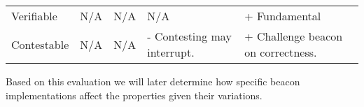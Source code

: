 \begin{table}[]
\begin{tabular}{@{}lllll@{}}
    Verifiable             & N/A                                                                       & N/A                                    & N/A                                                    & + Fundamental                                                    \\
    Contestable            & N/A                                                                       & N/A                                    & - Contesting may interrupt.                            & + Challenge beacon on correctness.                               \\ \bottomrule
    \end{tabular}
    \end{table}

    Based on this evaluation we will later determine how specific beacon implementations affect the properties given their variations. 